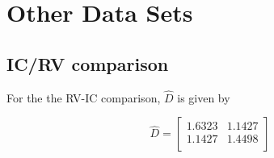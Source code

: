\documentclass[12pt, a4paper]{report}
\theoremstyle{plain}
\theoremstyle{definition}
\theoremstyle{remark}
\begin{document}






\chapter{Other Data Sets}
\section{IC/RV comparison}

For the the RV-IC comparison, $\hat{D}$ is given by


\begin{equation}
\hat{D}= \left[ \begin{array}{cc}
1.6323 & 1.1427  \\
1.1427 & 1.4498 \\
\end{array} \right]
\end{equation}
\end{document}
